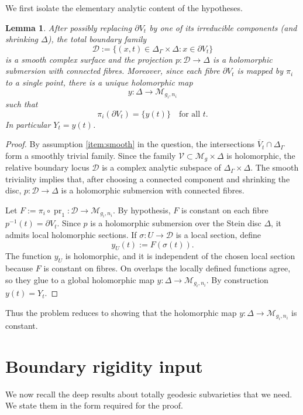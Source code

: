 \documentclass[11pt]{article}
\newtheorem{lemma}[theorem]{Lemma}
\theoremstyle{definition}
\newcommand{\M}{\mathcal M}
\newcommand{\ov}{\overline}
\newcommand{\bV}{\mathcal V}
\newcommand{\bD}{\mathcal D}
\begin{document}
We first isolate the elementary analytic content of the hypotheses.

\begin{lemma}\label{lem:pointmap}
After possibly replacing $\partial V_t$ by one of its irreducible components (and shrinking $\Delta$), the total boundary family
\[
\bD:=\{(x,t)\in \Delta_\Gamma\times \Delta : x\in \partial V_t\}
\]
is a smooth complex surface and the projection $p:\bD\to\Delta$ is a holomorphic submersion with connected fibres.  Moreover, since each fibre $\partial V_t$ is mapped by $\pi_i$ to a single point, there is a unique holomorphic map
\[
y:\Delta\longrightarrow \M_{g_i,n_i}
\]
such that
\[
\pi_i(\partial V_t)=\{y(t)\}\quad\text{for all }t.
\]
In particular $Y_t=y(t)$.
\end{lemma}

\begin{proof}
By assumption \eqref{item:smooth} in the question, the intersections $\ov V_t\cap\Delta_\Gamma$ form a smoothly trivial family.  Since the family $\bV\subset \M_g\times\Delta$ is holomorphic, the relative boundary locus $\bD$ is a complex analytic subspace of $\Delta_\Gamma\times\Delta$.  The smooth triviality implies that, after choosing a connected component and shrinking the disc, $p:\bD\to\Delta$ is a holomorphic submersion with connected fibres.

Let $F:=\pi_i\circ \operatorname{pr}_1:\bD\to \M_{g_i,n_i}$.  By hypothesis, $F$ is constant on each fibre $p^{-1}(t)=\partial V_t$.  Since $p$ is a holomorphic submersion over the Stein disc $\Delta$, it admits local holomorphic sections.  If $\sigma:U\to\bD$ is a local section, define
\[
y_U(t):=F(\sigma(t)).
\]
The function $y_U$ is holomorphic, and it is independent of the chosen local section because $F$ is constant on fibres.  On overlaps the locally defined functions agree, so they glue to a global holomorphic map $y:\Delta\to\M_{g_i,n_i}$.  By construction $y(t)=Y_t$.
\end{proof}

Thus the problem reduces to showing that the holomorphic map $y:\Delta\to\M_{g_i,n_i}$ is constant.

\section{Boundary rigidity input}

We now recall the deep results about totally geodesic subvarieties that we need.  We state them in the form required for the proof.
\end{document}
